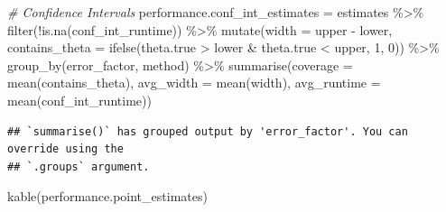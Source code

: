 \documentclass[
]{article}
\newenvironment{Shaded}{\begin{snugshade}}{\end{snugshade}}
\newcommand{\AttributeTok}[1]{\textcolor[rgb]{0.77,0.63,0.00}{#1}}
\newcommand{\CommentTok}[1]{\textcolor[rgb]{0.56,0.35,0.01}{\textit{#1}}}
\newcommand{\DecValTok}[1]{\textcolor[rgb]{0.00,0.00,0.81}{#1}}
\newcommand{\FunctionTok}[1]{\textcolor[rgb]{0.00,0.00,0.00}{#1}}
\newcommand{\NormalTok}[1]{#1}
\newcommand{\OtherTok}[1]{\textcolor[rgb]{0.56,0.35,0.01}{#1}}
\newcommand{\SpecialCharTok}[1]{\textcolor[rgb]{0.00,0.00,0.00}{#1}}
\begin{document}
\begin{Shaded}
\begin{Highlighting}[]
\CommentTok{\# Confidence Intervals}
\NormalTok{performance.conf\_int\_estimates }\OtherTok{=}\NormalTok{ estimates }\SpecialCharTok{\%\textgreater{}\%}
  \FunctionTok{filter}\NormalTok{(}\SpecialCharTok{!}\FunctionTok{is.na}\NormalTok{(conf\_int\_runtime)) }\SpecialCharTok{\%\textgreater{}\%}
  \FunctionTok{mutate}\NormalTok{(}\AttributeTok{width =}\NormalTok{ upper }\SpecialCharTok{{-}}\NormalTok{ lower,}
         \AttributeTok{contains\_theta =} \FunctionTok{ifelse}\NormalTok{(theta.true }\SpecialCharTok{\textgreater{}}\NormalTok{ lower }\SpecialCharTok{\&}\NormalTok{ theta.true }\SpecialCharTok{\textless{}}\NormalTok{ upper, }\DecValTok{1}\NormalTok{, }\DecValTok{0}\NormalTok{)) }\SpecialCharTok{\%\textgreater{}\%}
  \FunctionTok{group\_by}\NormalTok{(error\_factor, method) }\SpecialCharTok{\%\textgreater{}\%}
  \FunctionTok{summarise}\NormalTok{(}\AttributeTok{coverage =} \FunctionTok{mean}\NormalTok{(contains\_theta),}
            \AttributeTok{avg\_width =} \FunctionTok{mean}\NormalTok{(width),}
            \AttributeTok{avg\_runtime =} \FunctionTok{mean}\NormalTok{(conf\_int\_runtime))}
\end{Highlighting}
\end{Shaded}

\begin{verbatim}
## `summarise()` has grouped output by 'error_factor'. You can override using the
## `.groups` argument.
\end{verbatim}

\begin{Shaded}
\begin{Highlighting}[]
\FunctionTok{kable}\NormalTok{(performance.point\_estimates)}
\end{Highlighting}
\end{Shaded}
\end{document}
